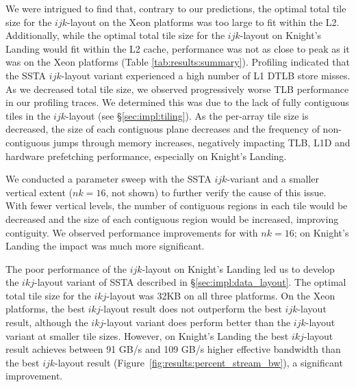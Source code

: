 \documentclass[10pt, conference, compsocconf]{IEEEtran}
\begin{document}
We were intrigued to find that, contrary to our predictions, the optimal total
  tile size for the \(ijk\)-layout on the Xeon platforms was too large to fit
  within the L2.
Additionally, while the optimal total tile size for the \(ijk\)-layout on
  Knight's Landing would fit within the L2 cache, performance was not as close to
  peak as it was on the Xeon platforms (Table \ref{tab:results:summary}).
Profiling indicated that the SSTA \(ijk\)-layout variant experienced a high
  number of L1 DTLB store misses.
As we decreased total tile size, we observed progressively worse TLB performance
  in our profiling traces.
We determined this was due to the lack of fully contiguous tiles in the
  \(ijk\)-layout (see \S\ref{sec:impl:tiling}). 
As the per-array tile size is decreased, the size of each contiguous
  plane decreases and the frequency of non-contiguous jumps through memory
  increases, negatively impacting TLB, L1D and hardware prefetching performance,
  especially on Knight's Landing.

We conducted a parameter sweep with the SSTA \(ijk\)-variant and a smaller
  vertical extent (\(nk = 16\), not shown) to further verify the cause of this
  issue.
With fewer vertical levels, the number of contiguous regions in each tile would
  be decreased and the size of each contiguous region would be increased,
  improving contiguity.
We observed performance improvements for with \(nk = 16\); on Knight's Landing
  the impact was much more significant.

The poor performance of the \(ijk\)-layout on Knight's Landing led us to
  develop the \(ikj\)-layout variant of SSTA described in
  \S\ref{sec:impl:data_layout}.
The optimal total tile size for the \(ikj\)-layout was 32KB on all three
  platforms.
On the Xeon platforms, the best \(ikj\)-layout result does not outperform the
  best \(ijk\)-layout result, although the \(ikj\)-layout variant does perform
  better than the \(ijk\)-layout variant at smaller tile sizes.
However, on Knight's Landing the best \(ikj\)-layout result achieves
  between 91 GB/s and 109 GB/s higher effective bandwidth than the best
  \(ijk\)-layout result (Figure~\ref{fig:results:percent_stream_bw}), a significant
  improvement.
\end{document}
